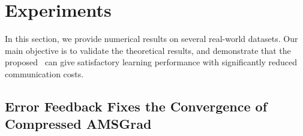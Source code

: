 \documentclass[11pt]{article}
\begin{document}









\section{Experiments}\label{sec:experiment}

In this section, we provide numerical results on several real-world datasets. Our main objective is to validate the theoretical results, and demonstrate that the proposed \algo\ can give satisfactory learning performance with significantly reduced communication costs. 

\subsection{Error Feedback Fixes the Convergence of Compressed AMSGrad}
\end{document}

